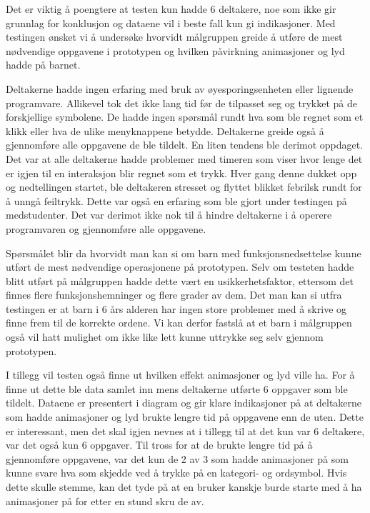 Det er viktig å poengtere at testen kun hadde 6 deltakere, noe som ikke gir grunnlag for konklusjon og dataene vil i beste fall kun gi indikasjoner.  Med testingen ønsket vi å undersøke hvorvidt målgruppen greide å utføre de mest nødvendige oppgavene i prototypen og hvilken påvirkning animasjoner og lyd hadde på barnet.  
 
Deltakerne hadde ingen erfaring med bruk av øyesporingsenheten eller lignende programvare. Allikevel tok det ikke lang tid før de tilpasset seg og trykket på de forskjellige symbolene. De hadde ingen spørsmål rundt hva som ble regnet som et klikk eller hva de ulike menyknappene betydde. Deltakerne greide også å gjennomføre alle oppgavene de ble tildelt. En liten tendens ble derimot oppdaget. Det var at alle deltakerne hadde problemer med timeren som viser hvor lenge det er igjen til en interaksjon blir regnet som et trykk. Hver gang denne dukket opp og nedtellingen startet, ble deltakeren stresset og flyttet blikket febrilsk rundt for å unngå feiltrykk. Dette var også en erfaring som ble gjort under testingen på medstudenter.  Det var derimot ikke nok til å hindre deltakerne i å operere programvaren og gjennomføre alle oppgavene.

Spørsmålet blir da hvorvidt man kan si om barn med funksjonsnedsettelse kunne utført de mest nødvendige operasjonene på prototypen. Selv om testeten hadde blitt utført på målgruppen hadde dette vært en usikkerhetsfaktor, ettersom det finnes flere funksjonshemninger og flere grader av dem. Det man kan si utfra testingen er at barn i 6 års alderen har ingen store problemer med å skrive og finne frem til de korrekte ordene. Vi kan derfor fastslå at et barn i målgruppen også vil hatt mulighet om ikke like lett kunne uttrykke seg selv gjennom prototypen. 
 
I tillegg vil testen også finne ut hvilken effekt animasjoner og lyd ville ha. For å finne ut dette ble data samlet inn mens deltakerne utførte 6 oppgaver som ble tildelt. Dataene er presentert i diagram og gir klare indikasjoner på at deltakerne som hadde animasjoner og lyd brukte lengre tid på oppgavene enn de uten. Dette er interessant, men det skal igjen nevnes at i tillegg til at det kun var 6 deltakere, var det også kun 6 oppgaver. Til tross for at de brukte lengre tid på å gjennomføre oppgavene, var det kun de 2 av 3 som hadde animasjoner på som kunne svare hva som skjedde ved å trykke på en kategori- og ordsymbol. Hvis dette skulle stemme, kan det tyde på at en bruker kanskje burde starte med å ha animasjoner på for etter en stund skru de av.  
 
